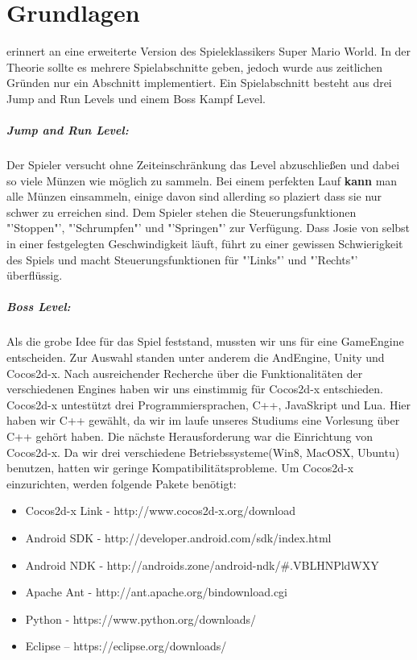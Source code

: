 \chapter{Grundlagen}\label{ch:grundl}



\gamename  erinnert an eine erweiterte Version des Spieleklassikers Super Mario World.
In der Theorie sollte es mehrere Spielabschnitte geben, jedoch wurde aus zeitlichen Gründen nur ein Abschnitt implementiert. Ein Spielabschnitt besteht aus drei Jump and Run Levels und einem Boss Kampf Level. 

\paragraph{Jump and Run Level:}
Der Spieler versucht ohne Zeiteinschränkung das Level abzuschließen und dabei so viele Münzen wie möglich zu sammeln. Bei einem perfekten Lauf \textbf{kann} man alle Münzen einsammeln, einige davon sind allerding so plaziert dass sie nur schwer zu erreichen sind.
Dem Spieler stehen die Steuerungsfunktionen "'Stoppen"', "'Schrumpfen"' und "'Springen"' zur Verfügung. 
Dass Josie von selbst in einer festgelegten Geschwindigkeit läuft, führt zu einer gewissen Schwierigkeit des Spiels und macht Steuerungsfunktionen für "'Links"' und "'Rechts"' überflüssig.

\paragraph{Boss Level:}



\label{sec:2_Framework}
Als die grobe Idee für das Spiel feststand, mussten wir uns für eine GameEngine entscheiden. Zur Auswahl standen unter anderem die AndEngine, Unity und Cocos2d-x. Nach ausreichender Recherche über die Funktionalitäten der verschiedenen Engines haben wir uns einstimmig für Cocos2d-x entschieden. Cocos2d-x untestützt drei Programmiersprachen, C++, JavaSkript und Lua. Hier haben wir C++ gewählt, da wir im laufe unseres Studiums eine Vorlesung über C++ gehört haben.
Die nächste Herausforderung war die Einrichtung von Cocos2d-x. Da wir drei verschiedene Betriebssysteme(Win8, MacOSX, Ubuntu) benutzen, hatten wir geringe Kompatibilitätsprobleme.
Um Cocos2d-x einzurichten, werden folgende Pakete benötigt:

\begin{itemize}
\item Cocos2d-x Link - http://www.cocos2d-x.org/download
\item Android SDK - http://developer.android.com/sdk/index.html
\item Android NDK - http://androids.zone/android-ndk/#.VBLHNPldWXY
\item Apache Ant - http://ant.apache.org/bindownload.cgi
\item Python - https://www.python.org/downloads/
\item Eclipse – https://eclipse.org/downloads/
\end{itemize}

